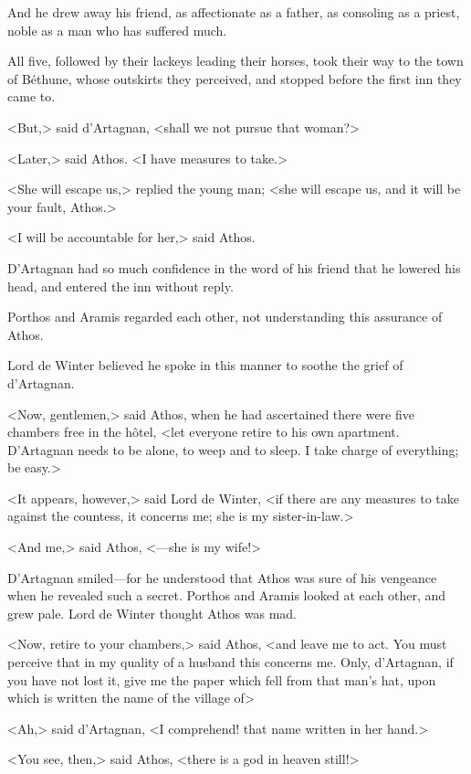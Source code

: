 And he drew away his friend, as affectionate as a father, as consoling as a priest, noble as a man who has suffered much. 

All five, followed by their lackeys leading their horses, took their way to the town of Béthune, whose outskirts they perceived, and stopped before the first inn they came to. 

<But,> said d'Artagnan, <shall we not pursue that woman?> 

<Later,> said Athos. <I have measures to take.> 

<She will escape us,> replied the young man; <she will escape us, and it will be your fault, Athos.> 

<I will be accountable for her,> said Athos. 

D'Artagnan had so much confidence in the word of his friend that he lowered his head, and entered the inn without reply. 

Porthos and Aramis regarded each other, not understanding this assurance of Athos. 

Lord de Winter believed he spoke in this manner to soothe the grief of d'Artagnan. 

<Now, gentlemen,> said Athos, when he had ascertained there were five chambers free in the hôtel, <let everyone retire to his own apartment. D'Artagnan needs to be alone, to weep and to sleep. I take charge of everything; be easy.> 

<It appears, however,> said Lord de Winter, <if there are any measures to take against the countess, it concerns me; she is my sister-in-law.> 

<And me,> said Athos, <---she is my wife!> 

D'Artagnan smiled---for he understood that Athos was sure of his vengeance when he revealed such a secret. Porthos and Aramis looked at each other, and grew pale. Lord de Winter thought Athos was mad. 

<Now, retire to your chambers,> said Athos, <and leave me to act. You must perceive that in my quality of a husband this concerns me. Only, d'Artagnan, if you have not lost it, give me the paper which fell from that man's hat, upon which is written the name of the village of\longdash> 

<Ah,> said d'Artagnan, <I comprehend! that name written in her hand.> 

<You see, then,> said Athos, <there is a god in heaven still!>